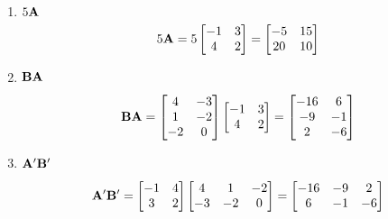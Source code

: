         \begin{enumerate}[label=(\alph*)]
            \item $5\bold{A}$
            \[ 5\bold{A} =
            5 \begin{bmatrix}
              -1 & 3 \\
              4 & 2  
            \end{bmatrix} = 
            \begin{bmatrix}
                -5 & 15 \\
                20 & 10  
              \end{bmatrix}
            \]

            \item $\bold{BA}$
            

            \[
                \bold{BA} =
                \begin{bmatrix}
                    4  & -3 \\
                    1  & -2 \\
                    -2 &  0
                \end{bmatrix}
                \begin{bmatrix}
                    -1 & 3 \\
                    4 & 2  
                  \end{bmatrix} =
                  \begin{bmatrix}
                    -16  & 6 \\
                    -9 & -1 \\
                    2 &  -6
                \end{bmatrix}
            \]

            \item $\bold{A}^\prime \bold{B}^\prime$
            

            \[
                \bold{A}^\prime \bold{B}^\prime =
                \begin{bmatrix}
                    -1 & 4 \\
                    3 & 2
                \end{bmatrix}
                \begin{bmatrix}
                    4 & 1 & -2 \\
                    -3 & -2 & 0
                \end{bmatrix} = 
                \begin{bmatrix}
                    -16 & -9 & 2 \\
                    6 & -1 & -6
                \end{bmatrix}
            \]



\end{enumerate}
